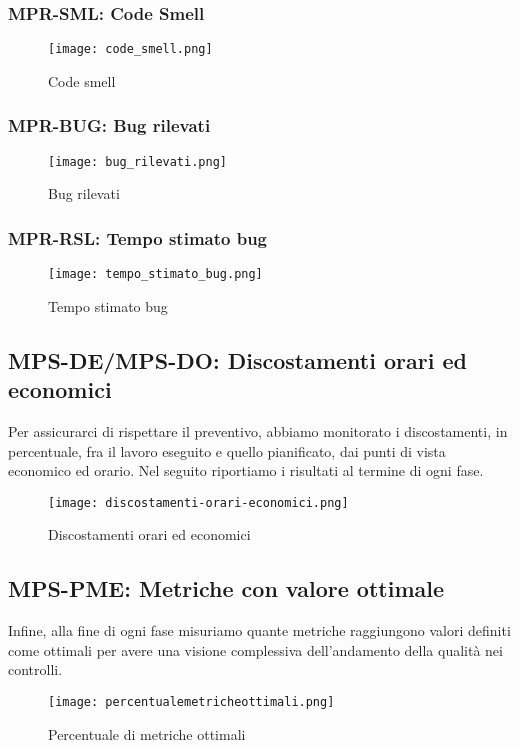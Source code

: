\documentclass[../piano-di-qualifica.tex]{subfiles}
\begin{document}
\subsubsection{MPR-SML\@: Code Smell}%
\label{subs:code_smell}


\begin{figure}[H]
  \centering
  \texttt{[image: code\_smell.png]}%
  \caption{Code smell}%
  \label{fig:code_smell}%
\end{figure}


\subsubsection{MPR-BUG\@: Bug rilevati}%
\label{subs:bug_rilevati}

\begin{figure}[H]
  \centering
  \texttt{[image: bug\_rilevati.png]}%
  \caption{Bug rilevati}%
  \label{fig:bug_rilevati}%
\end{figure}

\subsubsection{MPR-RSL\@: Tempo stimato bug}%
\label{subs:tempo_stimato}

\begin{figure}[H]
  \centering
  \texttt{[image: tempo\_stimato\_bug.png]}%
  \caption{Tempo stimato bug}%
  \label{fig:tempo_stimato_bug}%
\end{figure}


\newpage

\subsection{MPS-DE/MPS-DO\@: Discostamenti orari ed economici}%
\label{sub:discostamenti_orari_ed_economici}
Per assicurarci di rispettare il preventivo, abbiamo monitorato i discostamenti, in percentuale, fra il lavoro eseguito e quello pianificato, dai punti di vista economico ed orario. Nel seguito riportiamo i risultati al termine di ogni fase.

\begin{figure}[H]
  \centering
  \texttt{[image: discostamenti-orari-economici.png]}%
  \caption{Discostamenti orari ed economici}%
  \label{fig:discostamenti_orari_economici}%
\end{figure}

\subsection{MPS-PME\@: Metriche con valore ottimale}%
\label{sub:metriche_ottimali}
Infine, alla fine di ogni fase misuriamo quante metriche raggiungono valori definiti come ottimali per avere una visione complessiva dell'andamento della qualità nei controlli.
\begin{figure}[H]
  \centering
  \texttt{[image: percentualemetricheottimali.png]}%
  \caption{Percentuale di metriche ottimali}%
  \label{fig:metriche_ottimali}%
\end{figure}
\end{document}
